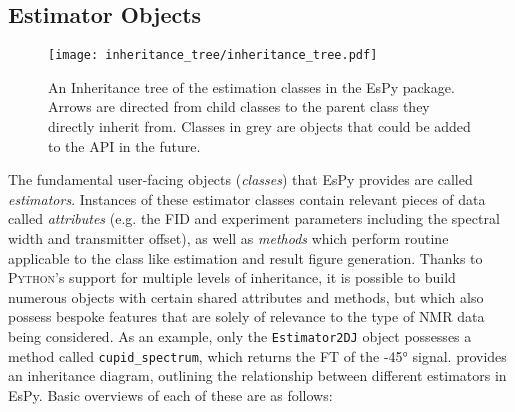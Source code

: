 \subsection{Estimator Objects}
\label{subsec:estimator-objects}
\begin{figure}
    \centering
    \texttt{[image: inheritance\_tree/inheritance\_tree.pdf]}
    \caption[
        An inheritance tree of the estimation classes in the \acs{EsPy} package.
    ]{
        An Inheritance tree of the estimation classes in the \acs{EsPy} package.
        Arrows are directed from child classes to the parent class they
        directly inherit from. Classes in grey are objects that could be added
        to the \ac{API} in the future.
    }
    \label{fig:inheritance}
\end{figure}
The fundamental user-facing objects (\emph{classes}) that \ac{EsPy} provides are
called \emph{estimators}.
Instances of these estimator classes contain relevant pieces of data called
\emph{attributes} (e.g. the \ac{FID} and experiment parameters including the
spectral width and transmitter offset), as well as \emph{methods} which perform
routine applicable to the class like estimation and result figure generation.
Thanks to \textsc{Python}'s support for multiple levels of inheritance, it is
possible to build numerous objects with certain shared attributes and methods,
but which also possess bespoke features that are solely of relevance to
the type of \ac{NMR} data being considered. As an example, only the
\texttt{Estimator2DJ} object possesses a method called \texttt{cupid\_spectrum},
which returns the \ac{FT} of the \ang{-45} signal.
 provides an inheritance
diagram, outlining the relationship between different estimators in
\ac{EsPy}. Basic overviews of each of these are as follows:
